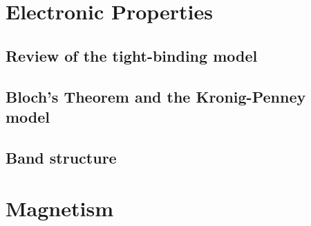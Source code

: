 \documentclass[12pt]{article}
\begin{document}
\newpage


\section{Electronic Properties}

\subsection{Review of the tight-binding model}

\subsection{Bloch's Theorem and the Kronig-Penney model}

\subsection{Band structure}

\section{Magnetism}

\subsection{}
\end{document}
